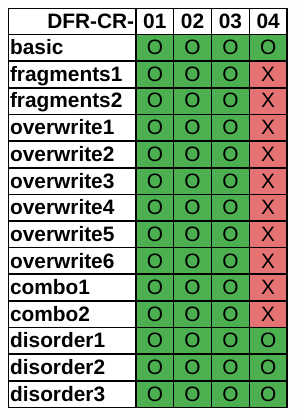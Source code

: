 \begin{figure}
\begin{subfigure}[t]{0.3\linewidth}
        \includegraphics[width=\linewidth]{fig/recuva_results_fat.pdf}
    \end{subfigure}
    \begin{subfigure}[b]{0.3\linewidth}

\end{subfigure}
\end{figure}
